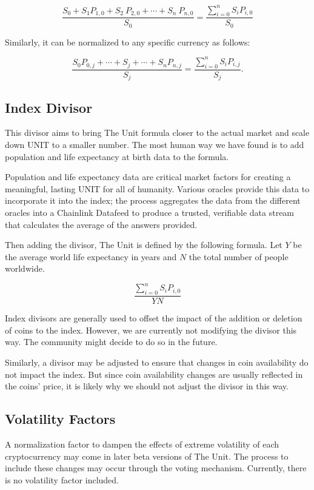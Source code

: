 \documentclass[12pt]{article}
\begin{document}
$$
\frac{S_0+S_1 P_{1,0}+ S_2\ P_{2,0}+\cdots+ S_n\ P_{n,0}}{S_0}= \frac{\displaystyle{\sum_{i=0}^{n} S_iP_{i,0}}}{S_0}
$$

Similarly, it can be normalized to any specific currency as follows:


$$
\frac{S_0P_{0,j}+\cdots+S_j+\cdots+S_nP_{n,j}}{S_j} = \frac{\displaystyle{\sum_{i=0}^{n} S_iP_{i,j}}}{S_j}.
$$


\subsection{Index Divisor}

This divisor aims to bring The Unit formula closer to the actual market and scale down UNIT to a smaller number. The most human way we have found is to add population and life expectancy at birth data to the formula.

Population and life expectancy data are critical market factors for creating a meaningful, lasting UNIT for all of humanity. Various oracles provide this data to incorporate it into the index; the process aggregates the data from the different oracles into a Chainlink Datafeed to produce a trusted, verifiable data stream that calculates the average of the answers provided. 


Then adding the divisor, The Unit is defined by the following formula. Let $Y$ be the average world life expectancy in years and $N$ the total number of people worldwide. 

$$
\frac{\displaystyle{\sum_{i=0}^{n} S_iP_{i,0}}}{Y N}
$$

Index divisors are generally used to offset the impact of the addition or deletion of coins to the index. However, we are currently not modifying the divisor this way. The community might decide to do so in the future. 

Similarly, a divisor may be adjusted to ensure that changes in coin availability do not impact the index. But since coin availability changes are usually reflected in the coins' price, it is likely why we should not adjust the divisor in this way.

\subsection{Volatility Factors}

A normalization factor to dampen the effects of extreme volatility of each cryptocurrency may come in later beta versions of The Unit. The process to include these changes may occur through the voting mechanism. Currently, there is no volatility factor included.
\end{document}
